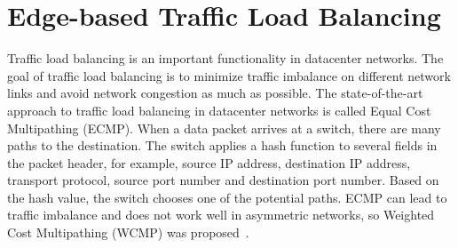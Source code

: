 \section{Edge-based Traffic Load Balancing}

\iffalse
Modern datacenter networks are built with multi-stage Clos networks. 
An example of such topologies is Google's Jupiter topology~\cite{singh2015jupiter}. 
A nice property of multi-stage Clos network is that there are tens to hundreds of 
network paths between any two servers in the datacenter. Path diversity is good for network 
reliability and traffic load balancing. 
\fi
Traffic load balancing is an important functionality in datacenter networks. 
The goal of traffic load balancing is to minimize traffic imbalance on different network links and 
avoid network congestion as much as possible.
The state-of-the-art approach to traffic load balancing in datacenter networks 
is called Equal Cost Multipathing (ECMP). When a data packet arrives at a switch, 
there are many paths to the destination. The switch applies a hash function to several 
fields in the packet header, for example, source IP address, destination IP address, 
transport protocol, source port number and destination port number. Based on the hash value, 
the switch chooses one of the potential paths. ECMP can lead to traffic imbalance and 
does not work well in asymmetric networks, so Weighted Cost Multipathing (WCMP) was proposed~\cite{wcmp}.

